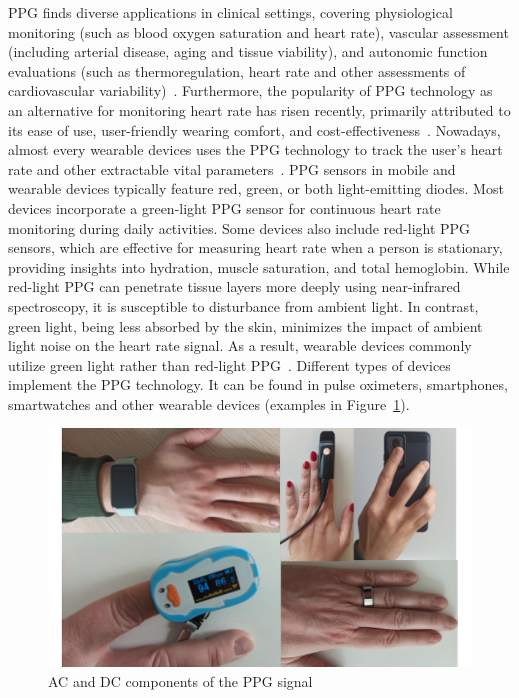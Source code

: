 PPG finds diverse applications in clinical settings, covering physiological monitoring (such as blood oxygen saturation and heart rate), vascular assessment (including arterial disease, aging and tissue viability), and autonomic function evaluations (such as thermoregulation, heart rate and other assessments of cardiovascular variability)~\cite{allenPhotoplethysmographyItsApplication2007a}.
Furthermore, the popularity of PPG technology as an alternative for monitoring heart rate has risen recently, primarily attributed to its ease of use, user-friendly wearing comfort, and cost-effectiveness~\cite{sviridovaHumanPhotoplethysmogramNew2015}.
Nowadays, almost every wearable devices uses the PPG technology to track the user's heart rate and other extractable vital parameters~\cite{castanedaReviewWearablePhotoplethysmography2018}.
PPG sensors in mobile and wearable devices typically feature red, green, or both light-emitting diodes.
Most devices incorporate a green-light PPG sensor for continuous heart rate monitoring during daily activities.
Some devices also include red-light PPG sensors, which are effective for measuring heart rate when a person is stationary, providing insights into hydration, muscle saturation, and total hemoglobin.
While red-light PPG can penetrate tissue layers more deeply using near-infrared spectroscopy, it is susceptible to disturbance from ambient light.
In contrast, green light, being less absorbed by the skin, minimizes the impact of ambient light noise on the heart rate signal.
As a result, wearable devices commonly utilize green light rather than red-light PPG~\cite{ponnadaTechnologicalConsiderationsSensorassisted2019}.
Different types of devices implement the PPG technology.
It can be found in pulse oximeters, smartphones, smartwatches and other wearable devices (examples in Figure~\ref{fig:ppg-devices}).

\begin{figure}[h]
    \centering
    \includegraphics[scale=0.35]{images/ppg/ppg-devices}
    \caption{AC and DC components of the PPG signal \cite{zanelliPotentialAIBased2023}}
    \label{fig:ppg-devices}
\end{figure}

